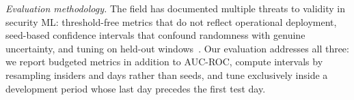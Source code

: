 \emph{Evaluation methodology.} The field has documented multiple threats to validity in security
ML: threshold-free metrics that do not reflect operational deployment, seed-based confidence
intervals that confound randomness with genuine uncertainty, and tuning on held-out
windows~\cite{arp2022dos}. Our evaluation addresses all three: we report budgeted metrics in
addition to AUC-ROC, compute intervals by resampling insiders and days rather than seeds, and
tune exclusively inside a development period whose last day precedes the first test day.

